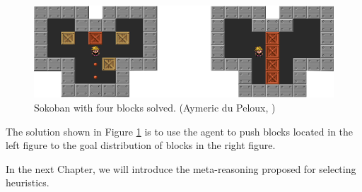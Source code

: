 \begin{figure}[!htb]
\begin{center}
  \includegraphics[width=12cm,scale=0.5]{images/sokoban_star_end}
\end{center}
\caption{Sokoban with four blocks solved. (Aymeric du Peloux, \citeyear{sokoban2010})}\label{fig:img_sokoban_solved}
\end{figure}

The solution shown in Figure \ref{fig:img_sokoban_solved} is to use the agent to push blocks located in the left figure to the goal distribution of blocks in the right figure.
\fi

\bigskip

In the next Chapter, we will introduce the meta-reasoning proposed for selecting heuristics.

\clearpage